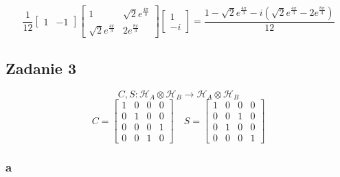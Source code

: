 \documentclass{../notatki}
\begin{document}
$$
\frac{1}{12}
\begin{bmatrix}
  1 & -1
\end{bmatrix}
\begin{bmatrix}
  1 & \sqrt{2}e^{\frac{4\pi}{3}} \\
  \sqrt{2}e^{\frac{4\pi}{3}} & 2e^{\frac{8\pi}{3}}
\end{bmatrix}
\begin{bmatrix}
  1 \\ -i
\end{bmatrix} = \frac{1 - \sqrt{2}e^{\frac{4\pi}{3}} -
i(\sqrt{2}e^{\frac{4\pi}{3}} - 2e^{\frac{8\pi}{3}})}{12}
$$

\subsection{Zadanie 3}

$$
C, S : \mathcal{H}_A\otimes\mathcal{H}_B \to \mathcal{H}_A\otimes\mathcal{H}_B
$$
$$
C =
\begin{bmatrix}
  1 & 0 & 0 & 0 \\
  0 & 1 & 0 & 0 \\
  0 & 0 & 0 & 1 \\
  0 & 0 & 1 & 0
\end{bmatrix} \quad
S =
\begin{bmatrix}
  1 & 0 & 0 & 0 \\
  0 & 0 & 1 & 0 \\
  0 & 1 & 0 & 0 \\
  0 & 0 & 0 & 1
\end{bmatrix}
$$

\subsubsection{a}
\end{document}
